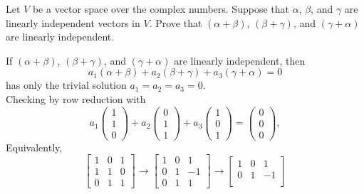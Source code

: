 \documentclass[11pt]{article}
\begin{document}
\pagebreak

\begin{homeworkProblem}
    Let $V$ be a vector space over the complex numbers. Suppose that $\alpha$, $\beta$, and $\gamma$ are linearly independent vectors in $V$.
    Prove that $(\alpha + \beta)$, $(\beta + \gamma)$, and $(\gamma + \alpha)$ are linearly independent. \\

    \solution

    If $(\alpha + \beta)$, $(\beta + \gamma)$, and $(\gamma + \alpha)$ are linearly independent, then
    \[
        a_1 (\alpha + \beta) + a_2 (\beta + \gamma) + a_3 (\gamma + \alpha) = 0
    \]
    has only the trivial solution $a_1 = a_2 = a_3 = 0$. \\

    Checking by row reduction with
    \[
        a_1 \begin{pmatrix}
            1 \\ 1 \\ 0
        \end{pmatrix} + a_2 \begin{pmatrix}
            0 \\ 1 \\ 1
        \end{pmatrix} + a_3 \begin{pmatrix}
            1 \\ 0 \\ 1
        \end{pmatrix} = \begin{pmatrix}
            0 \\ 0 \\ 0
        \end{pmatrix},
    \]
    Equivalently,
    \[
        \begin{bmatrix}
            1 & 0 & 1 \\
            1 & 1 & 0 \\
            0 & 1 & 1
        \end{bmatrix} \rightarrow
        \begin{bmatrix}
            1 & 0 & 1  \\
            0 & 1 & -1 \\
            0 & 1 & 1
        \end{bmatrix} \rightarrow
        \begin{bmatrix}
            1 & 0 & 1  \\
            0 & 1 & -1 \\

\end{bmatrix}\]
\end{homeworkProblem}
\end{document}
